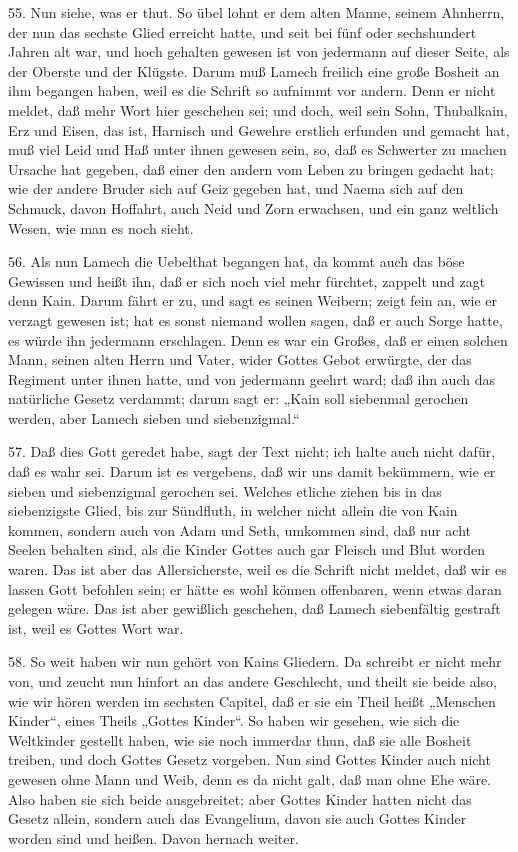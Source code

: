 55. Nun siehe, was er thut. So übel lohnt er dem alten Manne, seinem Ahnherrn, der nun das sechste Glied erreicht hatte, und seit bei fünf oder sechshundert Jahren alt war, und hoch gehalten gewesen ist von jedermann auf dieser Seite, als der Oberste und der Klügste. Darum muß Lamech freilich eine große Bosheit an ihm begangen haben, weil es die Schrift so aufnimmt vor andern. Denn er nicht meldet, daß mehr Wort hier geschehen sei; und doch, weil sein Sohn, Thubalkain, Erz und Eisen, das ist, Harnisch und Gewehre erstlich erfunden und gemacht hat, muß viel Leid und Haß unter ihnen gewesen sein, so, daß es Schwerter zu machen Ursache hat gegeben, daß einer den andern vom Leben zu bringen gedacht hat; wie der andere Bruder sich auf Geiz gegeben hat, und Naema sich auf den Schmuck, davon Hoffahrt, auch Neid und Zorn erwachsen, und ein ganz weltlich Wesen, wie man es noch sieht.

56. Als nun Lamech die Uebelthat begangen hat, da kommt auch das böse Gewissen und heißt ihn, daß er sich noch viel mehr fürchtet, zappelt und zagt denn Kain. Darum fährt er zu, und sagt es seinen Weibern; zeigt fein an, wie er verzagt gewesen ist; hat es sonst niemand wollen sagen, daß er auch Sorge hatte, es würde ihn jedermann erschlagen. Denn es war ein Großes, daß er einen solchen Mann, seinen alten Herrn und Vater, wider Gottes Gebot erwürgte, der das Regiment unter ihnen hatte, und von jedermann geehrt ward; daß ihn auch das natürliche Gesetz verdammt; darum sagt er: „Kain soll siebenmal gerochen werden, aber Lamech sieben und siebenzigmal.“

57. Daß dies Gott geredet habe, sagt der Text nicht; ich halte auch nicht dafür, daß es wahr sei. Darum ist es vergebens, daß wir uns damit bekümmern, wie er sieben und siebenzigmal gerochen sei. Welches etliche ziehen bis in das siebenzigste Glied, bis zur Sündfluth, in welcher nicht allein die von Kain kommen, sondern auch von Adam und Seth, umkommen sind, daß nur acht Seelen behalten sind, als die Kinder Gottes auch gar Fleisch und Blut worden waren. Das ist aber das Allersicherste, weil es die Schrift nicht meldet, daß wir es lassen Gott befohlen sein; er hätte es wohl können offenbaren, wenn etwas daran gelegen wäre. Das ist aber gewißlich geschehen, daß Lamech siebenfältig gestraft ist, weil es Gottes Wort war.

58. So weit haben wir nun gehört von Kains Gliedern. Da schreibt er nicht mehr von, und zeucht nun hinfort an das andere Geschlecht, und theilt sie beide also, wie wir hören werden im sechsten Capitel, daß er sie ein Theil heißt „Menschen Kinder“, eines Theils „Gottes Kinder“. So haben wir gesehen, wie sich die Weltkinder gestellt haben, wie sie noch immerdar thun, daß sie alle Bosheit treiben, und doch Gottes Gesetz vorgeben. Nun sind Gottes Kinder auch nicht
gewesen ohne Mann und Weib, denn es da nicht galt, daß man ohne Ehe wäre. Also haben sie sich beide ausgebreitet; aber Gottes Kinder hatten nicht das Gesetz allein, sondern auch das Evangelium, davon sie auch Gottes Kinder worden sind und heißen. Davon hernach weiter.

